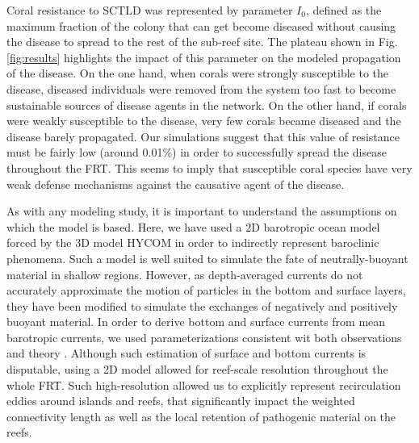 \documentclass[utf8]{frontiersSCNS}
\begin{document}
Coral resistance to SCTLD was represented by parameter $I_0$, defined as the maximum fraction of the colony that can get become diseased without causing the disease to spread to the rest of the sub-reef site. The plateau shown in Fig. \ref{fig:results} highlights the impact of this parameter on the modeled propagation of the disease. On the one hand, when corals were strongly susceptible to the disease, diseased individuals were removed from the system too fast to become sustainable sources of disease agents in the network. On the other hand, if corals were weakly susceptible to the disease, very few corals became diseased and the disease barely propagated. Our simulations suggest that this value of resistance must be fairly low (around 0.01\%) in order to successfully spread the disease throughout the FRT. This seems to imply that susceptible coral species have very weak defense mechanisms against the causative agent of the disease.

As with any modeling study, it is important to understand the assumptions on which the model is based. Here, we have used a 2D barotropic ocean model forced by the 3D model HYCOM \citep{Chassignet2007} in order to indirectly represent baroclinic phenomena. Such a model is well suited to simulate the fate of neutrally-buoyant material in shallow regions. However, as depth-averaged currents do not accurately approximate the motion of particles in the bottom and surface layers, they have been modified to simulate the exchanges of negatively and positively buoyant material. In order to derive bottom and surface currents from mean barotropic currents, we used parameterizations consistent wit both observations and theory \citep{ardhuin2009observation,perlin2007organization, kundu1976ekman, smith2009influence}. Although such estimation of surface and bottom currents is disputable, using a 2D model allowed for reef-scale resolution throughout the whole FRT. Such high-resolution allowed us to explicitly represent recirculation eddies around islands and reefs, that significantly impact the weighted connectivity length as well as the local retention of pathogenic material on the reefs.
\end{document}
